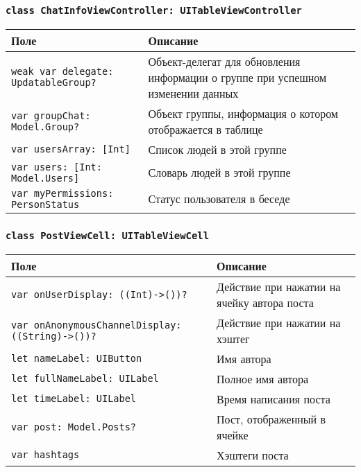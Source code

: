 \subsubsection*{\texttt{class ChatInfoViewController: UITableViewController}}

\begin{longtable}{| >{\raggedright\arraybackslash}p{} | p{}|}
\hline
\textbf{Поле} & \textbf{Описание} \\ \hline
\texttt{weak var delegate: UpdatableGroup?} & {Объект-делегат для обновления информации о группе при успешном изменении данных} \\ \hline
\texttt{var groupChat: Model.Group?} & {Объект группы, информация о котором отображается в таблице} \\ \hline
\texttt{var usersArray: [Int] } & {Список людей в этой группе} \\ \hline
\texttt{var users: [Int: Model.Users] } & {Словарь людей в этой группе} \\ \hline
\texttt{var myPermissions: PersonStatus } & {Статус пользователя в беседе} \\ \hline
\end{longtable}



\subsubsection*{\texttt{class PostViewCell: UITableViewCell}}

\begin{longtable}{| >{\raggedright\arraybackslash}p{} | p{}|}
\hline
\textbf{Поле} & \textbf{Описание} \\ \hline
\texttt{var onUserDisplay: ((Int)->())?} & {Действие при нажатии на ячейку автора поста} \\ \hline
\texttt{var onAnonymousChannelDisplay: ((String)->())?} & {Действие при нажатии на хэштег} \\ \hline
\texttt{let nameLabel: UIButton } & {Имя автора} \\ \hline
\texttt{let fullNameLabel: UILabel } & {Полное имя автора} \\ \hline
\texttt{let timeLabel: UILabel } & {Время написания поста} \\ \hline
\texttt{var post: Model.Posts?} & {Пост, отображенный в ячейке} \\ \hline
\texttt{var hashtags } & {Хэштеги поста} \\ \hline
\end{longtable}


